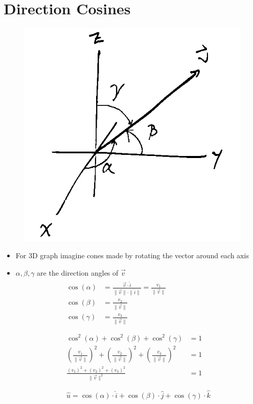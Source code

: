 \documentclass{article}
\begin{document}
\section{Direction Cosines}
  \begin{figure}[h]
    \includegraphics[scale=0.5]{direction_angles}
    \centering
    \label{fig:direction_angles}
  \end{figure}
\begin{itemize}
  \item For 3D graph imagine cones made by rotating the vector around each axis
  \item $\alpha, \beta, \gamma$ are the direction angles of $\vec{v}$
  \begin{align}
    \begin{split}
      \cos(\alpha) &= \frac{\vec{v}\cdot\hat{i}}{\|\vec{v}\|\cdot\|\hat{i}\|} = \frac{v_1}{\|\vec{v}\|} \\
      \cos(\beta) &= \frac{v_2}{\|\vec{v}\|} \\
      \cos(\gamma) &= \frac{v_3}{\|\vec{v}\|} \\
    \end{split} \\
    \begin{split}
      \cos^2(\alpha) + \cos^2(\beta) + \cos^2(\gamma) &= 1 \\
      \left( \frac{v_1}{\|\vec{v}\|} \right)^2 + \left( \frac{v_2}{\|\vec{v}\|} \right)^2 + \left( \frac{v_3}{\|\vec{v}\|} \right)^2 &= 1 \\
      \frac{(v_1)^2 + (v_2)^2 + (v_3)^2}{\|\vec{v}\|^2} &= 1 \\
    \end{split} \\
    \begin{split}
      \hat{u} = \cos(\alpha)\cdot\hat{i} + \cos(\beta)\cdot\hat{j} + \cos(\gamma)\cdot\hat{k}
    \end{split}
  \end{align}
\end{itemize}
\end{document}

